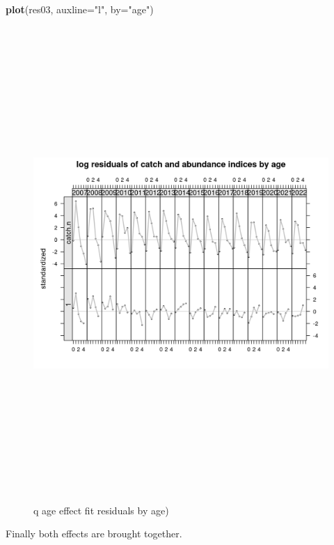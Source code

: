 \documentclass[
]{book}
\newenvironment{Shaded}{\begin{snugshade}}{\end{snugshade}}
\newcommand{\AttributeTok}[1]{\textcolor[rgb]{0.13,0.29,0.53}{#1}}
\newcommand{\FunctionTok}[1]{\textcolor[rgb]{0.13,0.29,0.53}{\textbf{#1}}}
\newcommand{\NormalTok}[1]{#1}
\newcommand{\StringTok}[1]{\textcolor[rgb]{0.31,0.60,0.02}{#1}}
\begin{document}
\begin{Shaded}
\begin{Highlighting}[]
\FunctionTok{plot}\NormalTok{(res03, }\AttributeTok{auxline=}\StringTok{"l"}\NormalTok{, }\AttributeTok{by=}\StringTok{"age"}\NormalTok{)}
\end{Highlighting}
\end{Shaded}

\begin{figure}
\includegraphics[width=25cm,height=18cm,angle=90]{_bookdown_files/_main_files/figure-html/qageresbyage-1} \caption{q age effect fit residuals by age)}\label{fig:qageresbyage}
\end{figure}

Finally both effects are brought together.
\end{document}
